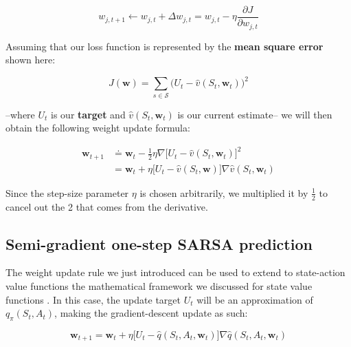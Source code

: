 \begin{equation}
    w_{j,t+1} \leftarrow w_{j,t} + \Delta w_{j,t} = w_{j,t} - \eta \frac{\partial J}{\partial w_{j,t}}
    \label{eq:ch7-singlesgdfunctionapproxupdate}
\end{equation}

Assuming that our loss function is represented by the \textbf{mean square error} shown here:

\begin{equation}
    J(\boldsymbol{w}) = \sum_{s \in \mathcal{S}} \big(U_t - \hat{v}(S_t, \boldsymbol{w}_t) \big)^2
    \label{eq:ch7-meansquareerrorfunction}
\end{equation}

--where $U_t$ is our \textbf{target} and $\hat{v}(S_t, \boldsymbol{w}_t)$ is our current estimate-- we will then obtain the following weight update formula:

\begin{equation}
    \begin{split}
        \boldsymbol{w}_{t+1} &\doteq \boldsymbol{w}_t - \frac{1}{2} \eta \nabla \big[ U_t - \hat{v}(S_t, \boldsymbol{w}_t) \big]^2 \\
        &= \boldsymbol{w}_t + \eta \big[ U_t - \hat{v}(S_t, \boldsymbol{w}) \big] \nabla \hat{v} (S_t, \boldsymbol{w}_t)
    \end{split}
    \label{eq:ch7-genericstatefunctionapproxssdweightupdate}
\end{equation}

Since the step-size parameter $\eta$ is chosen arbitrarily, we multiplied it by $\frac{1}{2}$ to cancel out the 2 that comes from the derivative.

\subsection{Semi-gradient one-step SARSA prediction}
The weight update rule we just introduced can be used to extend to state-action value functions the mathematical framework we discussed for state value functions . In this case, the update target $U_t$ will be an approximation of $q_\pi (S_t,A_t )$, making the gradient-descent update as such:

\begin{equation}
    \boldsymbol{w}_{t+1} = \boldsymbol{w}_t + \eta \big[ U_t - \hat{q}(S_t,A_t,\boldsymbol{w}_t) \big] \nabla \hat{q}(S_t,A_t,\boldsymbol{w}_t)
    \label{eq:ch7-genericqvaluefunctionapproxssdweightupdate}
\end{equation}

